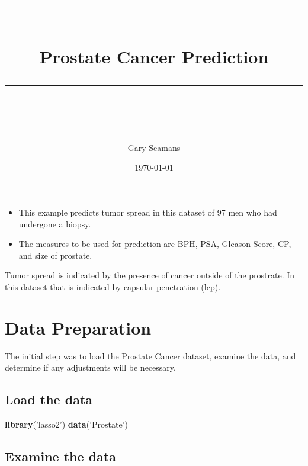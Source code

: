 \documentclass[]{article}
\title{}
\author{}
\date{}
\newenvironment{Shaded}{\begin{snugshade}}{\end{snugshade}}
\newcommand{\KeywordTok}[1]{\textcolor[rgb]{0.13,0.29,0.53}{\textbf{#1}}}
\newcommand{\StringTok}[1]{\textcolor[rgb]{0.31,0.60,0.02}{#1}}
\newcommand{\NormalTok}[1]{#1}
\providecommand{\tightlist}{%
  \setlength{\itemsep}{0pt}\setlength{\parskip}{0pt}}
\renewcommand{\&}{and}
\begin{document}
\newcommand{\horrule}[1]{\rule{\linewidth}{#1}}

\title{
        \normalfont \normalsize
        \horrule{0.5pt} \\[0.4cm]
        \large Prostate Cancer Prediction  \\ 
        \horrule{2pt} \\[0.5cm]
}

\author{Gary Seamans}\date{\normalsize\today}\maketitle


\begin{itemize}
\tightlist
\item
  This example predicts tumor spread in this dataset of 97 men who had
  undergone a biopsy.
\item
  The measures to be used for prediction are BPH, PSA, Gleason Score,
  CP, and size of prostate.
\end{itemize}

Tumor spread is indicated by the presence of cancer outside of the
prostrate. In this dataset that is indicated by capsular penetration
(lcp).

\section{Data Preparation}\label{data-preparation}

The initial step was to load the Prostate Cancer dataset, examine the
data, and determine if any adjustments will be necessary.

\subsection{Load the data}\label{load-the-data}

\begin{Shaded}
\begin{Highlighting}[]
\KeywordTok{library}\NormalTok{(}\StringTok{'lasso2'}\NormalTok{)}
\KeywordTok{data}\NormalTok{(}\StringTok{'Prostate'}\NormalTok{)}
\end{Highlighting}
\end{Shaded}

\subsection{Examine the data}\label{examine-the-data}
\end{document}
